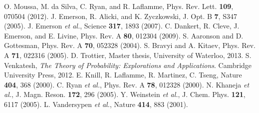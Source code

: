 \documentclass[prl,twocolumn,showpacs]{revtex4-1}
\begin{document}
\begin{thebibliography}{99}
 O. Moussa, M. da Silva, C. Ryan, and R. Laflamme, Phys. Rev. Lett. \textbf{109}, 070504 (2012).
 J. Emerson, R. Alicki, and K. Zyczkowski, J. Opt. B \textbf{7}, S347 (2005).
 J. Emerson \emph{et al.}, Science \textbf{317}, 1893 (2007).
 C. Dankert, R. Cleve, J. Emerson, and E. Livine, Phys. Rev. A \textbf{80}, 012304 (2009).
 S. Aaronson and D. Gottesman, Phys. Rev. A \textbf{70}, 052328 (2004).
 S. Bravyi and A. Kitaev, Phys. Rev. A \textbf{71}, 022316 (2005).
 D. Trottier, Master thesis, University of Waterloo, 2013.
 S. Venkatesh, \emph{The Theory of Probability: Explorations and Applications}. Cambridge University Press, 2012.
 E. Knill, R. Laflamme, R. Martinez, C. Tseng, Nature \textbf{404}, 368 (2000).
 C. Ryan \emph{et al.}, Phys. Rev. A \textbf{78}, 012328 (2000).
 N. Khaneja \emph{et al.}, J. Magn. Reson. \textbf{172}, 296 (2005).
 Y. Weinstein \emph{et al.}, J. Chem. Phys. \textbf{121}, 6117 (2005).
 L. Vandersypen \emph{et al.}, Nature \textbf{414}, 883 (2001).
\end{thebibliography}
\end{document}
